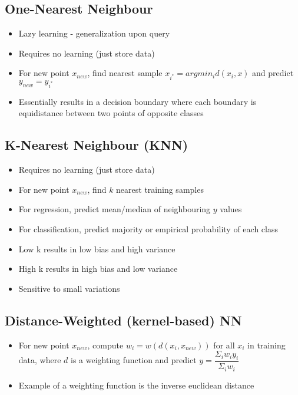 \documentclass[12pt]{article}
\begin{document}
\subsection{One-Nearest Neighbour}

\begin{itemize}
	\item Lazy learning - generalization upon query
	\item Requires no learning (just store data)
	\item For new point $x_{new}$, find nearest sample $x_{i^*} = argmin_i d(x_i, x)$ and predict $y_{new} = y_{i^*}$
	\item Essentially results in a decision boundary where each boundary is equidistance between two points of opposite classes
\end{itemize}

\subsection{K-Nearest Neighbour (KNN)}

\begin{itemize}
	\item Requires no learning (just store data)
	\item For new point $x_{new}$, find $k$ nearest training samples 
	\item For regression, predict mean/median of neighbouring $y$ values 
	\item For classification, predict majority or empirical probability of each class
	\item Low k results in low bias and high variance 
	\item High k results in high bias and low variance 
	\item Sensitive to small variations
\end{itemize}

\subsection{Distance-Weighted (kernel-based) NN}

\begin{itemize}
	\item For new point $x_{new}$, compute $w_i = w(d(x_i, x_{new}))$ for all $x_i$ in training data, where $d$ is a weighting function and predict $y = \dfrac{\Sigma_i w_i y_i}{\Sigma_i w_i}$
	\item Example of a weighting function is the inverse euclidean distance
\end{itemize}
\end{document}
